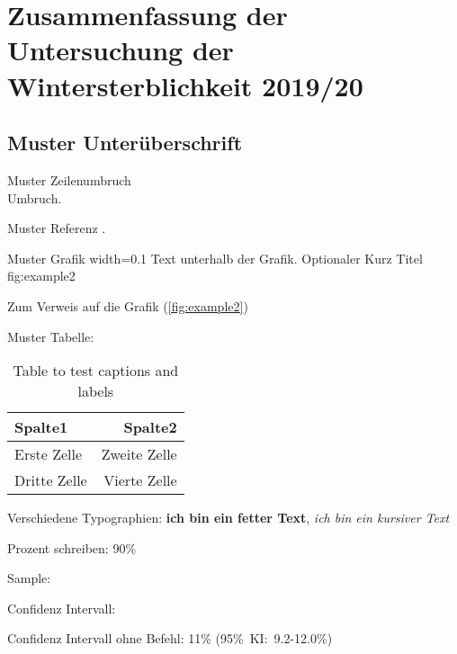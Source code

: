
\section{Zusammenfassung der Untersuchung der Wintersterblichkeit 2019/20}

\subsection{Muster Unterüberschrift}

Muster Zeilenumbruch \\ Umbruch.

Muster Referenz \citep{morawetzHealthStatusHoney2019}.

Muster Grafik
  {width=0.1\textwidth} %
  {Text unterhalb der Grafik.} %
  {Optionaler Kurz Titel} %
  {fig:example2} %
  
Zum Verweis auf die Grafik (\cref{fig:example2})
  
Muster Tabelle:

\begin{table}[htp]
    \centering
    \begin{tabular}{|l|r|} 
      \hline
      Spalte1 & Spalte2 \\
      \hline
      Erste Zelle & Zweite Zelle \\
      \hline
      Dritte Zelle & Vierte Zelle \\
      \hline
    \end{tabular}
    \caption{Table to test captions and labels}
    \label{tab:example2}
\end{table}

Verschiedene Typographien: \textbf{ich bin ein fetter Text}, \textit{ich bin ein kursiver Text}

Prozent schreiben: 90\%

Sample: 

Confidenz Intervall:  %

Confidenz Intervall ohne Befehl: 11\% (95\%~KI:~9.2-12.0\%)

